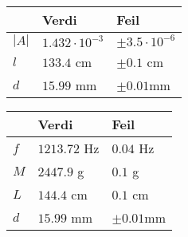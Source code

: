 \documentclass{article}
\begin{document}
\begin{table}
	\center 
	\begin{tabular}{|l|l|l|}
	  \hline
	   & Verdi & Feil \\ \hline
	  $|A|$ & $1.432\cdot10^{-3}$ & $\pm 3.5\cdot10^{-6}$ \\ \hline
	  $l$ & $133.4$ cm & $\pm 0.1$ cm \\ \hline
	  $d$ & $15.99$ mm & $\pm 0.01$mm \\ \hline
	\end{tabular}	
\end{table}	

\begin{table}
	\center
	\begin{tabular}{|l|l|l|}
	  \hline
	   & Verdi & Feil \\ \hline
	  $f$ & $1213.72$ Hz & $0.04$ Hz \\ \hline
	  $M$ & $2447.9$ g & $0.1$ g \\ \hline
	  $L$ & $144.4$ cm & $0.1$ cm \\ \hline
	  $d$ & $15.99$ mm & $\pm 0.01$mm \\ \hline
	\end{tabular}		
\end{table}
\end{document}
